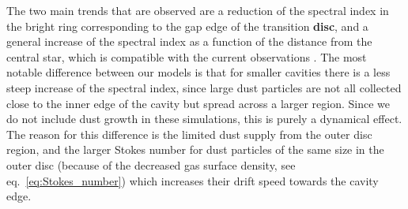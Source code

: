 \documentclass[fleqn,usenatbib]{mnras}
\begin{document}
    The two main trends that are observed are a reduction of the spectral index in the bright ring corresponding to the gap edge of the transition \textbf{disc}, and a general increase of the spectral index as a function of the distance from the central star, which is compatible with the current observations \citep[e.g.][]{Long2020}.
    The most notable difference between our models is that for smaller cavities there is a less steep increase of the spectral index, since large dust particles are not all collected close to the inner edge of the cavity but spread across a larger region.
    Since we do not include dust growth in these simulations, this is purely a dynamical effect. The reason for this difference is the limited dust supply from the outer disc region, and the larger Stokes number for dust particles of the same size in the outer disc (because of the decreased gas surface density, see eq.~\ref{eq:Stokes_number}) which increases their drift speed towards the cavity edge.
\end{document}
